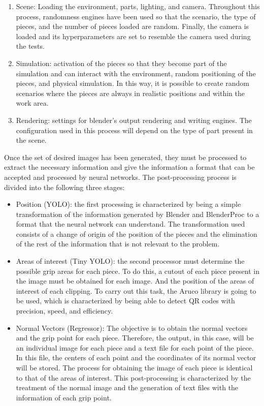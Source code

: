 {\begin{enumerate}
\item Scene: Loading the environment, parts, lighting, and camera. Throughout this process, randomness engines have been used so that the scenario, the type of pieces, and the number of pieces loaded are random. Finally, the camera is loaded and its hyperparameters are set to resemble the camera used during the tests.

\item Simulation: activation of the pieces so that they become part of the simulation and can interact with the environment, random positioning of the pieces, and physical simulation. In this way, it is possible to create random scenarios where the pieces are always in realistic positions and within the work area.

\item Rendering: settings for blender's output rendering and writing engines. The configuration used in this process will depend on the type of part present in the scene.
\end{enumerate}

Once the set of desired images has been generated, they must be processed to extract the necessary information and give the information a format that can be accepted and processed by neural networks. The post-processing process is divided into the following three stages:

\begin{itemize}
\item Position (YOLO): the first processing is characterized by being a simple transformation of the information generated by Blender and BlenderProc to a format that the neural network can understand. The transformation used consists of a change of origin of the position of the pieces and the elimination of the rest of the information that is not relevant to the problem.

\item Areas of interest (Tiny YOLO): the second processor must determine the possible grip areas for each piece. To do this, a cutout of each piece present in the image must be obtained for each image. And the position of the areas of interest of each clipping. To carry out this task, the Aruco library is going to be used, which is characterized by being able to detect QR codes with precision, speed, and efficiency.

\item Normal Vectors (Regressor): The objective is to obtain the normal vectors and the grip point for each piece. Therefore, the output, in this case, will be an individual image for each piece and a text file for each point of the piece. In this file, the centers of each point and the coordinates of its normal vector will be stored. The process for obtaining the image of each piece is identical to that of the areas of interest. This post-processing is characterized by the treatment of the normal image and the generation of text files with the information of each grip point.
\end{itemize}

}

